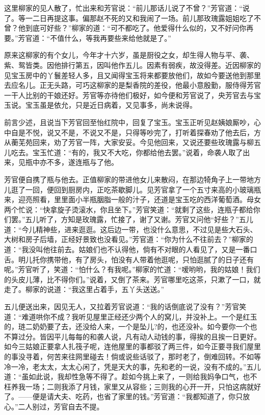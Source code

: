 \documentclass[12pt,oneside]{book}
\begin{document}
这里柳家的见人散了，忙出来和芳官说：“前儿那话儿说了不曾？”芳官道：“说了。等一二日再提这事。偏那赵不死的又和我闹了一场。前儿那玫瑰露姐姐吃了不曾？他到底可好些？”柳家的道：“可不都吃了。他爱得什么似的，又不好问你再要。”芳官道：“不值什么，等我再要些来给他就是了。”

原来这柳家的有个女儿，今年才十六岁，虽是厨役之女，却生得人物与平、袭、紫、鸳皆类。因他排行第五，因叫他作五儿。因素有弱疾，故没得差。近因柳家的见宝玉房中的丫鬟差轻人多，且又闻得宝玉将来都要放他们，故如今要送他到那里去应名儿。正无头路，可巧这柳家的是梨香院的差役，他最小意殷勤，服侍得芳官一干人比别的干娘还好。芳官等亦待他们极好，如今便和芳官说了，央芳官去与宝玉说。宝玉虽是依允，只是近日病着，又见事多，尚未说得。

前言少述，且说当下芳官回至怡红院中，回复了宝玉。宝玉正听见赵姨娘厮吵，心中自是不悦，说又不是，不说又不是，只得等吵完了，打听着探春劝了他去后，方从蘅芜苑回来，劝了芳官一阵，大家安妥。今见他回来，又说还要些玫瑰露与柳五儿吃去。宝玉忙道：“有的，我又不大吃，你都给他去罢。”说着，命袭人取了出来，见瓶中亦不多，遂连瓶与了他。

芳官便自携了瓶与他去。正值柳家的带进他女儿来散闷，在那边犄角子上一带地方儿逛了一回，便回到厨房内，正吃茶歇脚儿。见芳官拿了一个五寸来高的小玻璃瓶来，迎亮照看，里里面小半瓶胭脂一般的汁子，还道是宝玉吃的西洋葡萄酒。母女两个忙说：“快拿旋子烫滚水，你且坐下。”芳官笑道：“就剩了这些，连瓶子都给你们罢。”五儿听了，方知是玫瑰露，忙接了，谢了又谢。芳官又问他“好些？”五儿道：“今儿精神些，进来逛逛。这后边一带，也没什么意思，不过见是些大石头、大树和房子后墙，正经好景致也没看见。”芳官道：“你为什么不往前去？”柳家的道：“我没叫他往前去。姑娘们也不认得他，倘有不对眼的人看见了，又是一番口舌。明儿托你携带他，有了房头，怕没有人带着他逛呢，只怕逛腻了的日子还有呢。”芳官听了，笑道：“怕什么？有我呢。”柳家的忙道：“嗳哟哟，我的姑娘！我们的头皮儿薄，比不得你们。”说着，又倒了茶来。芳官哪里吃这茶，只漱了一口，就走了。柳家的说道：“我这里占着手，五丫头送送。”

五儿便送出来，因见无人，又拉着芳官说道：“我的话倒底说了没有？”芳官笑道：“难道哄你不成？我听见屋里正经还少两个人的窝儿，并没补上。一个是红玉的，琏二奶奶要了去，还没给人来，一个是坠儿?的，也还没补。如今要你一个也不算过分。皆因平儿每每的和袭人说，凡有动人动钱的事，得挨的且挨一日更好。如今三姑娘正要拿人扎筏子呢，连他屋里的事都驳了两三件，如今正要寻我们屋里的事没寻着，何苦来往网里碰去！倘或说些话驳了，那时老了，倒难回转。不如等冷一冷，老太太，太太心闲了，凭是天大的事，先和老的一说，没有不成的。”五儿道：“虽如此说，我却性急等不得了。趁如今挑上来了，一则给我妈争口气，也不枉养我一场；二则我添了月钱，家里又从容些；三则我的心开一开，只怕这病就好了。——便是请大夫、吃药，也省了家里的钱。”芳官道：“我都知道了，你只放心。”二人别过，芳官自去不提。
\end{document}
